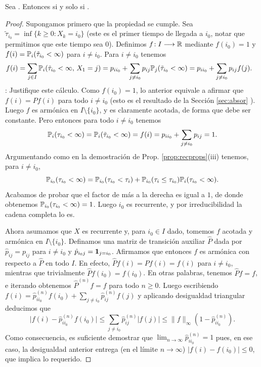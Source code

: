 \begin{thm}
Sea .
Entonces  si y solo si .
\end{thm}

\begin{proof}
Supongamos primero que la propiedad se cumple.
Sea $\tilde\tau_{i_0}=\inf\{k\geq0\!:X_k=i_0\}$ (este es el primer tiempo de llegada a $i_0$, notar que permitimos que este tiempo sea $0$).
Definimos $f\!:I\longrightarrow\mathbb{R}$ mediante $f(i_0)=1$ y $f(i)=\mathbb{P}_i(\tilde\tau_{i_0}<\infty)$ para $i\neq i_0$.
Para $i\neq i_0$ tenemos
\begin{align}
f(i)&=\sum_{j\in I}\mathbb{P}_{i}(\tilde\tau_{i_0}<\infty,\,X_1=j)=p_{ii_0}+\sum_{j\neq i_0}p_{ij}\mathbb{P}_{j}(\tilde\tau_{i_0}<\infty)=p_{ii_0}+\sum_{j\neq i_0}p_{ij}f(j).
\end{align}
\uexer: Justifique este cálculo.
Como $f(i_0)=1$, lo anterior equivale a afirmar que $f(i)=Pf(i)$ para todo $i\neq i_0$ (esto es el resultado de la Sección \ref{sec:absor} \ucmark).
Luego $f$ es armónica en $I\setminus\{i_0\}$, y es claramente acotada, de forma que debe ser constante.
Pero entonces para todo $i\neq i_0$ tenemos 
\[\mathbb{P}_i(\tau_{i_0}<\infty)=\mathbb{P}_i(\tilde\tau_{i_0}<\infty)=f(i)=p_{ii_0}+\sum_{j\neq i_0}p_{ij}=1.\]
Argumentando como en la demostración de Prop. \ref{prop:recprops}(iii) tenemos, para $i\neq i_0$,
\[\mathbb{P}_{i_0}(\tau_{i_0}<\infty)=\mathbb{P}_{i_0}(\tau_{i_0}<\tau_i)+\mathbb{P}_{i_0}(\tau_i\leq\tau_{i_0})\mathbb{P}_i(\tau_{i_0}<\infty).\]
Acabamos de probar que el factor de más a la derecha es igual a $1$, de donde obtenemos $\mathbb{P}_{i_0}(\tau_{i_0}<\infty)=1$.
Luego $i_0$ es recurrente, y por irreducibilidad la cadena completa lo es.

Ahora asumamos que $X$ es recurrente y, para $i_0\in I$ dado, tomemos $f$ acotada y armónica en $I\setminus\{i_0\}$.
Definamos una matriz de transición auxiliar $\hat P$ dada por $\hat p_{ij}=p_{ij}$ para $i\neq i_0$ y $\hat p_{i_0j}=\mathbf{1}_{j=i_0}$.
Afirmamos que entonces $f$ es armónica con respecto a $\hat P$ en todo $I$.
En efecto, $\hat Pf(i)=Pf(i)=f(i)$ para $i\neq i_0$, mientras que trivialmente $\hat Pf(i_0)=f(i_0)$.
En otras palabras, tenemos $\hat Pf=f$, e iterando obtenemos $\hat P^{(n)}f=f$ para todo $n\geq0$.
Luego escribiendo $f(i)=\hat p^{(n)}_{ii_0}f(i_0)+\sum_{j\neq i_0}\hat p^{(n)}_{ij}f(j)$ y aplicando  desigualdad triangular deducimos que
\[\big|f(i)-\hat p^{(n)}_{ii_0}f(i_0)\big|\leq\sum_{j\neq i_0}\hat p^{(n)}_{ij}|f(j)|\leq\|f\|_\infty(1-\hat p^{(n)}_{ii_0}).\]
Como consecuencia, es suficiente demostrar que $\lim_{n\to\infty}\hat p^{(n)}_{ii_0}=1$ pues, en ese caso, la desigualdad anterior entrega (en el límite $n\to\infty$) $|f(i)-f(i_0)|\leq0$, que implica lo requerido.


\end{proof}
